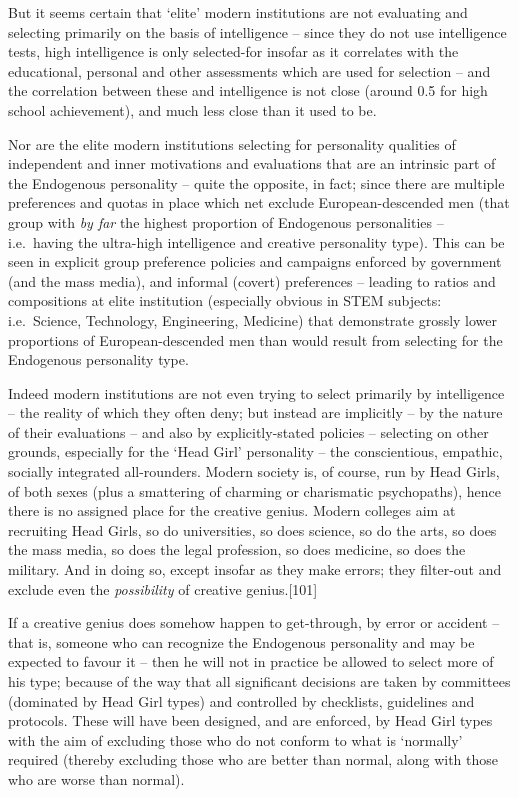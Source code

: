 \documentclass[
]{book}
\begin{document}
But it seems certain that `elite' modern institutions are not evaluating and selecting primarily on the basis of intelligence -- since they do not use intelligence tests, high intelligence is only selected-for insofar as it correlates with the educational, personal and other assessments which are used for selection -- and the correlation between these and intelligence is not close (around 0.5 for high school achievement), and much less close than it used to be.

Nor are the elite modern institutions selecting for personality qualities of independent and inner motivations and evaluations that are an intrinsic part of the Endogenous personality -- quite the opposite, in fact; since there are multiple preferences and quotas in place which net exclude European-descended men (that group with \emph{by far} the highest proportion of Endogenous personalities -- i.e.~having the ultra-high intelligence and creative personality type). This can be seen in explicit group preference policies and campaigns enforced by government (and the mass media), and informal (covert) preferences -- leading to ratios and compositions at elite institution (especially obvious in STEM subjects: i.e.~Science, Technology, Engineering, Medicine) that demonstrate grossly lower proportions of European-descended men than would result from selecting for the Endogenous personality type.

Indeed modern institutions are not even trying to select primarily by intelligence -- the reality of which they often deny; but instead are implicitly -- by the nature of their evaluations -- and also by explicitly-stated policies -- selecting on other grounds, especially for the `Head Girl' personality -- the conscientious, empathic, socially integrated all-rounders. Modern society is, of course, run by Head Girls, of both sexes (plus a smattering of charming or charismatic psychopaths), hence there is no assigned place for the creative genius. Modern colleges aim at recruiting Head Girls, so do universities, so does science, so do the arts, so does the mass media, so does the legal profession, so does medicine, so does the military. And in doing so, except insofar as they make errors; they filter-out and exclude even the \emph{possibility} of creative genius.{[}101{]}

If a creative genius does somehow happen to get-through, by error or accident -- that is, someone who can recognize the Endogenous personality and may be expected to favour it -- then he will not in practice be allowed to select more of his type; because of the way that all significant decisions are taken by committees (dominated by Head Girl types) and controlled by checklists, guidelines and protocols. These will have been designed, and are enforced, by Head Girl types with the aim of excluding those who do not conform to what is `normally' required (thereby excluding those who are better than normal, along with those who are worse than normal).
\end{document}
